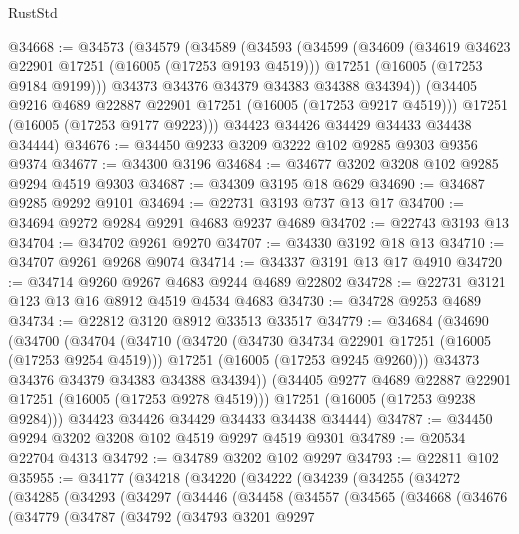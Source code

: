 \begin{lexlean}{RustStd}
\begin{coremodule}
@34668 := @34573
    (@34579
      (@34589
        (@34593
          (@34599
            (@34609
              (@34619 @34623 @22901 @17251 (@16005 (@17253 @9193 @4519)))
              @17251
              (@16005 (@17253 @9184 @9199)))
            @34373
            @34376
            @34379
            @34383
            @34388
            @34394))
        (@34405 @9216 @4689 @22887 @22901 @17251 (@16005 (@17253 @9217 @4519)))
        @17251
        (@16005 (@17253 @9177 @9223)))
      @34423
      @34426
      @34429
      @34433
      @34438
      @34444)
@34676 := @34450 @9233 @3209 @3222 @102 @9285 @9303 @9356 @9374
@34677 := @34300 @3196
@34684 := @34677 @3202 @3208 @102 @9285 @9294 @4519 @9303
@34687 := @34309 @3195 @18 @629
@34690 := @34687 @9285 @9292 @9101
@34694 := @22731 @3193 @737 @13 @17
@34700 := @34694 @9272 @9284 @9291 @4683 @9237 @4689
@34702 := @22743 @3193 @13
@34704 := @34702 @9261 @9270
@34707 := @34330 @3192 @18 @13
@34710 := @34707 @9261 @9268 @9074
@34714 := @34337 @3191 @13 @17 @4910
@34720 := @34714 @9260 @9267 @4683 @9244 @4689 @22802
@34728 := @22731 @3121 @123 @13 @16 @8912 @4519 @4534 @4683
@34730 := @34728 @9253 @4689
@34734 := @22812 @3120 @8912 @33513 @33517
@34779 := @34684
    (@34690
      (@34700
        (@34704
          (@34710
            (@34720
              (@34730 @34734 @22901 @17251 (@16005 (@17253 @9254 @4519)))
              @17251
              (@16005 (@17253 @9245 @9260)))
            @34373
            @34376
            @34379
            @34383
            @34388
            @34394))
        (@34405 @9277 @4689 @22887 @22901 @17251 (@16005 (@17253 @9278 @4519)))
        @17251
        (@16005 (@17253 @9238 @9284)))
      @34423
      @34426
      @34429
      @34433
      @34438
      @34444)
@34787 := @34450 @9294 @3202 @3208 @102 @4519 @9297 @4519 @9301
@34789 := @20534 @22704 @4313
@34792 := @34789 @3202 @102 @9297
@34793 := @22811 @102
@35955 := @34177
    (@34218
      (@34220
        (@34222
          (@34239
            (@34255
              (@34272
                (@34285
                  (@34293
                    (@34297
                      (@34446
                        (@34458
                          (@34557
                            (@34565
                              (@34668
                                (@34676
                                  (@34779
                                    (@34787
                                      (@34792
                                        (@34793
                                          @3201
                                          @9297

\end{coremodule}
\end{lexlean}
